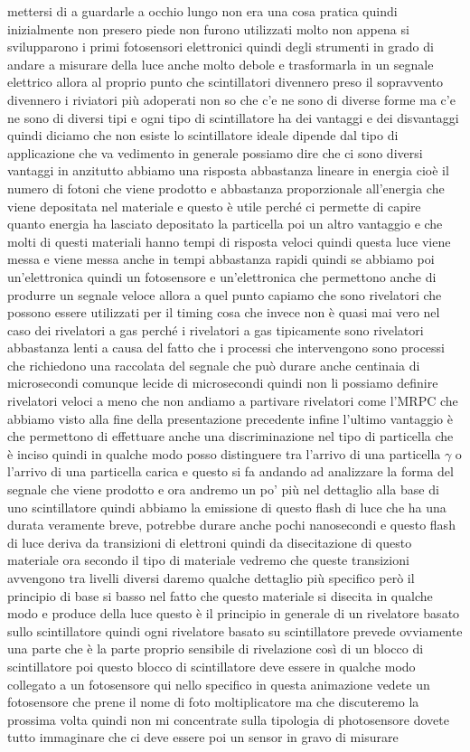 {mettersi di a guardarle a occhio lungo non era una cosa pratica quindi inizialmente non presero piede non furono utilizzati molto non appena si svilupparono i primi fotosensori elettronici quindi degli strumenti in grado di andare a misurare della luce anche molto debole e trasformarla in un segnale elettrico allora al proprio punto che scintillatori divennero preso il sopravvento divennero i riviatori più adoperati non so che c'e ne sono di diverse forme ma c'e ne sono di diversi tipi e ogni tipo di scintillatore ha dei vantaggi e dei disvantaggi quindi diciamo che non esiste lo scintillatore ideale dipende dal tipo di applicazione che va vedimento in generale possiamo dire che ci sono diversi vantaggi in anzitutto abbiamo una risposta abbastanza lineare in energia cioè il numero di fotoni che viene prodotto e abbastanza proporzionale all'energia che viene depositata nel materiale e questo è utile perché ci permette di capire quanto energia ha lasciato depositato la particella poi un altro vantaggio e che molti di questi materiali hanno tempi di risposta veloci quindi questa luce viene messa e viene messa anche in tempi abbastanza rapidi quindi se abbiamo poi un'elettronica quindi un fotosensore e un'elettronica che permettono anche di produrre un segnale veloce allora a quel punto capiamo che sono rivelatori che possono essere utilizzati per il timing cosa che invece non è quasi mai vero nel caso dei rivelatori a gas perché i rivelatori a gas tipicamente sono rivelatori abbastanza lenti a causa del fatto che i processi che intervengono sono processi che richiedono una raccolata del segnale che può durare anche centinaia di microsecondi comunque lecide di microsecondi quindi non li possiamo definire rivelatori veloci a meno che non andiamo a partivare rivelatori come l'MRPC che abbiamo visto alla fine della presentazione precedente infine l'ultimo vantaggio è che permettono di effettuare anche una discriminazione nel tipo di particella che è inciso quindi in qualche modo posso distinguere tra l'arrivo di una particella $\gamma$ o l'arrivo di una particella carica e questo si fa andando ad analizzare la forma del segnale che viene prodotto e ora andremo un po' più nel dettaglio alla base di uno scintillatore quindi abbiamo la emissione di questo flash di luce che ha una durata veramente breve, potrebbe durare anche pochi nanosecondi e questo flash di luce deriva da transizioni di elettroni quindi da disecitazione di questo materiale ora secondo il tipo di materiale vedremo che queste transizioni avvengono tra livelli diversi daremo qualche dettaglio più specifico però il principio di base si basso nel fatto che questo materiale si disecita in qualche modo e produce della luce questo è il principio in generale di un rivelatore basato sullo scintillatore quindi ogni rivelatore basato su scintillatore prevede ovviamente una parte che è la parte proprio sensibile di rivelazione così di un blocco di scintillatore poi questo blocco di scintillatore deve essere in qualche modo collegato a un fotosensore qui nello specifico in questa animazione vedete un fotosensore che prene il nome di foto moltiplicatore ma che discuteremo la prossima volta quindi non mi concentrate sulla tipologia di photosensore dovete tutto immaginare che ci deve essere poi un sensor in gravo di misurare }
